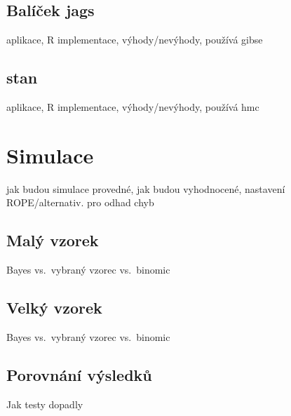 \documentclass[
  11pt,
  a4paper]{report}
\begin{document}
\subsection{Balíček jags}\label{baluxedux10dek-jags}

aplikace, R implementace, výhody/nevýhody, používá gibse

\subsection{stan}\label{stan}

aplikace, R implementace, výhody/nevýhody, používá hmc

\section{Simulace}\label{simulace}

jak budou simulace provedné, jak budou vyhodnocené, nastavení
ROPE/alternativ. pro odhad chyb

\subsection{Malý vzorek}\label{maluxfd-vzorek}

Bayes vs.~vybraný vzorec vs.~binomic

\subsection{Velký vzorek}\label{velkuxfd-vzorek}

Bayes vs.~vybraný vzorec vs.~binomic

\subsection{Porovnání výsledků}\label{porovnuxe1nuxed-vuxfdsledkux16f}

Jak testy dopadly
\end{document}
